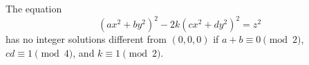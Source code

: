 \begin{proposition}
    The equation
\[
    (ax^2+by^2)^2-2k(cx^2+dy^2)^2=z^2
\]
    has no integer solutions different from $(0,0,0)$ if $a+b\equiv0\pmod2$, $cd\equiv1\pmod4$, and $k\equiv1\pmod2$.
\end{proposition}

